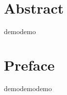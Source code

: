 
\begingroup
\let\clearpage\relax
\let\cleardoublepage\relax
\let\cleardoublepage\relax

\chapter*{Abstract}

demodemo

\vfill

\chapter*{Preface}

demodemodemo

\endgroup			

\vfill

